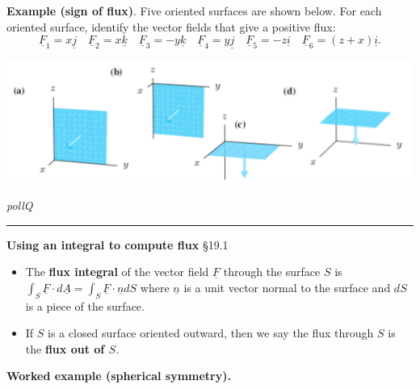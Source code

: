 \documentclass[12pt,letterpaper,noanswers]{exam}
\newcommand{\mb}[1]{\underline{#1}}
\begin{document}
\noindent\textbf{Example (sign of flux)}.  Five oriented surfaces are shown below.  For each oriented surface, identify the vector fields that give a positive flux:
\[\mb F_1 = x\mb j\quad \mb F_2 = x\mb k\quad \mb F_3 = -y\mb k\quad \mb F_4 = y\mb j\quad \mb F_5 = -z\mb i\quad \mb F_6 = (z+x)\mb i.\]

\includegraphics[width=\linewidth]{img/C29p4-18.png}

\emph{pollQ}

\vspace{0.2cm}
\hrule
\vspace{0.2cm}

\noindent\textbf{Using an integral to compute flux} \S 19.1
\begin{tcolorbox}
\begin{itemize}
\itemsep0em
    \item The \textbf{flux integral} of the vector field $\mb F$ through the surface $S$ is $\displaystyle \int_S \mb F\cdot d\mb A = \int_S \mb F \cdot \mb n dS$ where $\mb n$ is a unit vector normal to the surface and $dS$ is a piece of the surface.
    \item If $S$ is a closed surface oriented outward, then we say the flux through $S$ is the \textbf{flux out of $S$}.
\end{itemize}
\end{tcolorbox}

\noindent\textbf{Worked example (spherical symmetry).}  
\end{document}

